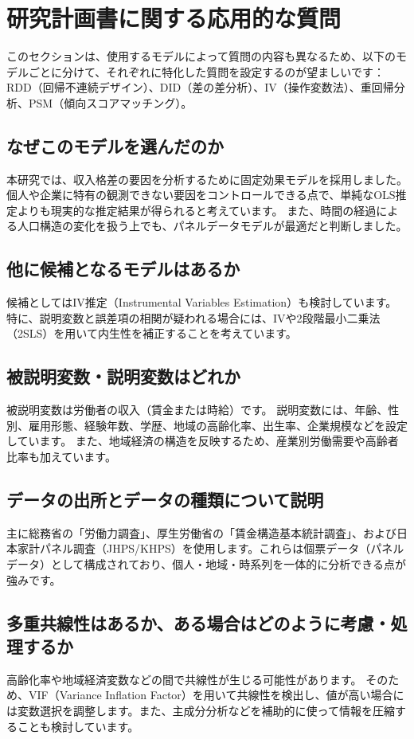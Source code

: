 \documentclass[xelatex,a4paper,base=11pt,ja=standard,jafont=noto]{bxjsreport}
\begin{document}
\chapter{研究計画書に関する応用的な質問}
このセクションは、使用するモデルによって質問の内容も異なるため、以下のモデルごとに分けて、それぞれに特化した質問を設定するのが望ましいです：RDD（回帰不連続デザイン）、DID（差の差分析）、IV（操作変数法）、重回帰分析、PSM（傾向スコアマッチング）。
\section{なぜこのモデルを選んだのか}
本研究では、収入格差の要因を分析するために固定効果モデルを採用しました。
個人や企業に特有の観測できない要因をコントロールできる点で、単純なOLS推定よりも現実的な推定結果が得られると考えています。
また、時間の経過による人口構造の変化を扱う上でも、パネルデータモデルが最適だと判断しました。
\section{他に候補となるモデルはあるか}
候補としてはIV推定（Instrumental Variables Estimation）も検討しています。
特に、説明変数と誤差項の相関が疑われる場合には、IVや2段階最小二乗法（2SLS）を用いて内生性を補正することを考えています。
\section{被説明変数・説明変数はどれか}
被説明変数は労働者の収入（賃金または時給）です。
説明変数には、年齢、性別、雇用形態、経験年数、学歴、地域の高齢化率、出生率、企業規模などを設定しています。
また、地域経済の構造を反映するため、産業別労働需要や高齢者比率も加えています。
\section{データの出所とデータの種類について説明}
主に総務省の「労働力調査」、厚生労働省の「賃金構造基本統計調査」、および日本家計パネル調査（JHPS/KHPS）を使用します。これらは個票データ（パネルデータ）として構成されており、個人・地域・時系列を一体的に分析できる点が強みです。
\section{多重共線性はあるか、ある場合はどのように考慮・処理するか}
高齢化率や地域経済変数などの間で共線性が生じる可能性があります。
そのため、VIF（Variance Inflation Factor）を用いて共線性を検出し、値が高い場合には変数選択を調整します。また、主成分分析などを補助的に使って情報を圧縮することも検討しています。
\end{document}
